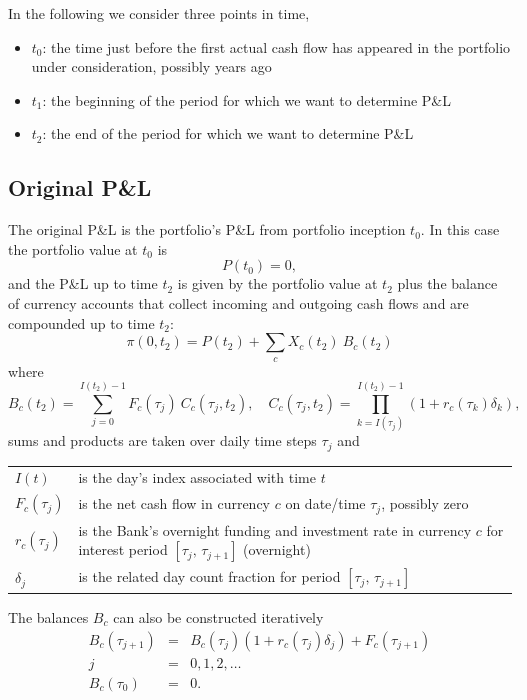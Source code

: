 In the following we consider three points in time,
\begin{itemize}
\item $t_0$: the time just before the first actual cash flow has appeared in the portfolio under consideration, possibly years ago
\item $t_1$: the beginning of the period for which we want to determine P\&L
\item $t_2$: the end of the period for which we want to determine P\&L
\end{itemize}

\subsection*{Original P\&L} \label{trade_start}

The original P\&L is the portfolio's P\&L from portfolio inception $t_0$.
In this case the portfolio value at $t_0$ is
$$P(t_0) = 0,$$
and the P\&L up to time $t_2$ is given by the portfolio value at $t_2$ plus the balance of currency accounts that collect incoming and outgoing cash flows and are compounded up to time $t_2$:
\begin{equation}
\pi(0, t_2) = P(t_2) + \sum_c X_c(t_2)\:B_c(t_2)
\label{pnl_3}
\end{equation}
where
\begin{equation}
B_c(t_2) = \sum_{j=0}^{I(t_2)-1} F_c(\tau_j)\:C_c(\tau_j, t_2), \quad C_c(\tau_j, t_2)=\prod_{k=I(\tau_j)}^{I(t_2)-1} (1+r_c(\tau_k)\delta_k),
\end{equation}
sums and products are taken over daily time steps $\tau_j$ and

\medskip
\begin{tabular}{lp{10cm}}
$I(t)$ & is the day's index associated with time $t$ \\
$F_c(\tau_{j})$ & is the net cash flow in currency $c$ on date/time $\tau_j$, possibly zero \\
$r_c(\tau_j)$ & is the Bank's overnight funding and investment rate in currency $c$ for interest period $[\tau_j, \,\tau_{j+1}]$ (overnight)\\
$\delta_j$ & is the related day count fraction for period $[\tau_j, \,\tau_{j+1}]$
\end{tabular}

\bigskip

The balances $B_c$ can also be constructed iteratively
\begin{eqnarray*}
B_c(\tau_{j+1}) &=& B_c(\tau_{j}) (1+r_c(\tau_j)\delta_j) + F_c(\tau_{j+1})
\label{recursion}\\
j &=& 0, 1, 2, \dots \nonumber\\
B_c(\tau_0) &=& 0. \nonumber
\end{eqnarray*}

